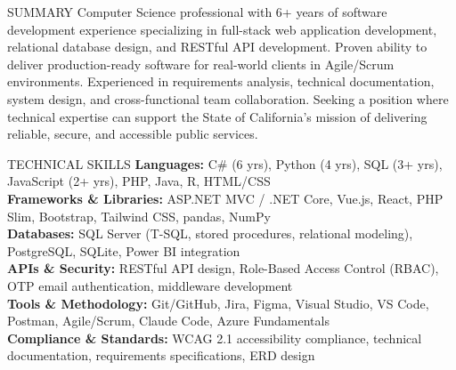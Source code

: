 \documentclass{resume}
\begin{document}

\begin{rSection}{SUMMARY}
Computer Science professional with 6+ years of software development experience specializing in full-stack web application development, relational database design, and RESTful API development. Proven ability to deliver production-ready software for real-world clients in Agile/Scrum environments. Experienced in requirements analysis, technical documentation, system design, and cross-functional team collaboration. Seeking a position where technical expertise can support the State of California's mission of delivering reliable, secure, and accessible public services.
\end{rSection}


\begin{rSection}{TECHNICAL SKILLS}
\textbf{Languages:} C\# (6 yrs), Python (4 yrs), SQL (3+ yrs), JavaScript (2+ yrs), PHP, Java, R, HTML/CSS \\
\textbf{Frameworks \& Libraries:} ASP.NET MVC / .NET Core, Vue.js, React, PHP Slim, Bootstrap, Tailwind CSS, pandas, NumPy \\
\textbf{Databases:} SQL Server (T-SQL, stored procedures, relational modeling), PostgreSQL, SQLite, Power BI integration \\
\textbf{APIs \& Security:} RESTful API design, Role-Based Access Control (RBAC), OTP email authentication, middleware development \\
\textbf{Tools \& Methodology:} Git/GitHub, Jira, Figma, Visual Studio, VS Code, Postman, Agile/Scrum, Claude Code, Azure Fundamentals \\
\textbf{Compliance \& Standards:} WCAG 2.1 accessibility compliance, technical documentation, requirements specifications, ERD design
\end{rSection}

\end{document}

